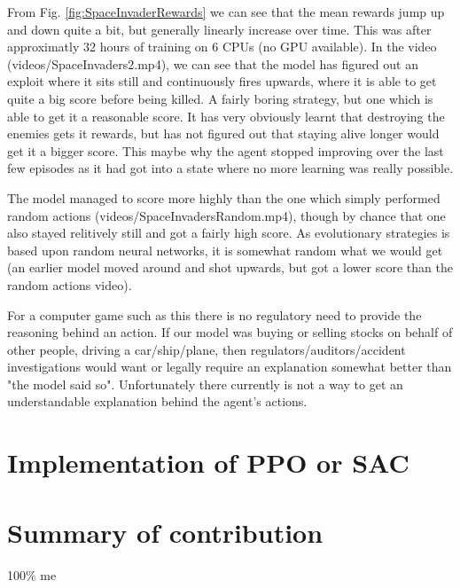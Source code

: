 \documentclass[a4pape, 11pt, english]{article}
\begin{document}
From Fig. \ref{fig:SpaceInvaderRewards} we can see that the mean rewards jump up and down quite a bit, but generally linearly increase over time. This was after approximatly 32 hours of training on 6 CPUs (no GPU available). In the video (videos/SpaceInvaders2.mp4), we can see that the model has figured out an exploit where it sits still and continuously fires upwards, where it is able to get quite a big score before being killed. A fairly boring strategy, but one which is able to get it a reasonable score. It has very obviously learnt that destroying the enemies gets it rewards, but has not figured out that staying alive longer would get it a bigger score. This maybe why the agent stopped improving over the last few episodes as it had got into a state where no more learning was really possible.

The model managed to score more highly than the one which simply performed random actions (videos/SpaceInvadersRandom.mp4), though by chance that one also stayed relitively still and got a fairly high score. As evolutionary strategies is based upon random neural networks, it is somewhat random what we would get (an earlier model moved around and shot upwards, but got a lower score than the random actions video).

For a computer game such as this there is no regulatory need to provide the reasoning behind an action. If our model was buying or selling stocks on behalf of other people, driving a car/ship/plane, then regulators/auditors/accident investigations would want or legally require an explanation somewhat better than "the model said so". Unfortunately there currently is not a way to get an understandable explanation behind the agent's actions.

\section{Implementation of PPO or SAC}

\section{Summary of contribution}
100\% me


\end{document}
